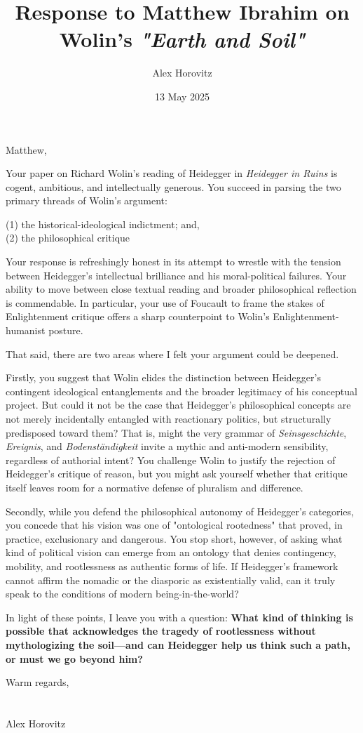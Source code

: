 \documentclass[11pt]{article}
\title{Response to Matthew Ibrahim on Wolin's \textit{"Earth and Soil"}}
\author{Alex Horovitz}
\date{13 May 2025}
\begin{document}
\onehalfspacing
\maketitle

Matthew,

Your paper on Richard Wolin's reading of Heidegger in \textit{Heidegger in Ruins} is cogent, ambitious, and intellectually generous. You succeed in parsing the two primary threads of Wolin's argument:

(1) the historical-ideological indictment; and,\\
(2) the philosophical critique

Your response is refreshingly honest in its attempt to wrestle with the tension between Heidegger's intellectual brilliance and his moral-political failures. Your ability to move between close textual reading and broader philosophical reflection is commendable. In particular, your use of Foucault to frame the stakes of Enlightenment critique offers a sharp counterpoint to Wolin's Enlightenment-humanist posture.

That said, there are two areas where I felt your argument could be deepened. 

Firstly, you suggest that Wolin elides the distinction between Heidegger's contingent ideological entanglements and the broader legitimacy of his conceptual project. But could it not be the case that Heidegger's philosophical concepts are not merely incidentally entangled with reactionary politics, but structurally predisposed toward them? That is, might the very grammar of \textit{Seinsgeschichte}, \textit{Ereignis}, and \textit{Bodenst\"andigkeit} invite a mythic and anti-modern sensibility, regardless of authorial intent? You challenge Wolin to justify the rejection of Heidegger's critique of reason, but you might ask yourself whether that critique itself leaves room for a normative defense of pluralism and difference.

Secondly, while you defend the philosophical autonomy of Heidegger's categories, you concede that his vision was one of "ontological rootedness" that proved, in practice, exclusionary and dangerous. You stop short, however, of asking what kind of political vision can emerge from an ontology that denies contingency, mobility, and rootlessness as authentic forms of life. If Heidegger's framework cannot affirm the nomadic or the diasporic as existentially valid, can it truly speak to the conditions of modern being-in-the-world?

In light of these points, I leave you with a question: \textbf{What kind of thinking is possible that acknowledges the tragedy of rootlessness without mythologizing the soil—and can Heidegger help us think such a path, or must we go beyond him?}

Warm regards,
\\
\\
\\
Alex Horovitz
\end{document}
